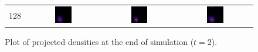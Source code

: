 \documentclass{article}
\begin{document}
\begin{figure}[ht]
\begin{tabular}{cccc}
$128$ & 
\includegraphics[width=0.24\textwidth]{s42r128s20psi1.png} &
\includegraphics[width=0.24\textwidth]{s42r128s20psi2.png} &
\includegraphics[width=0.24\textwidth]{s42r128s20psi3.png} \\
\end{tabular}
\caption{Plot of projected densities at the end of simulation ($t=2$).}
\end{figure}
\end{document}
